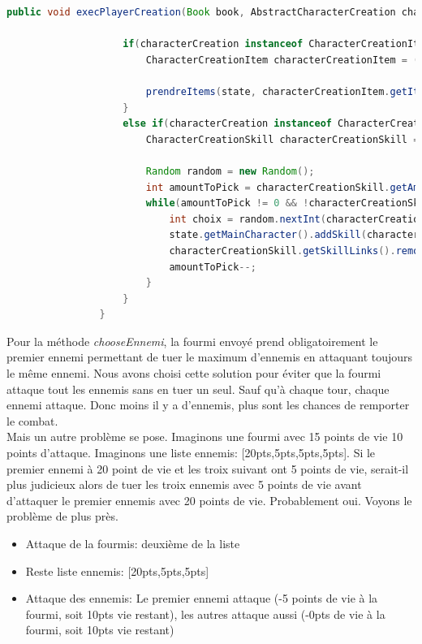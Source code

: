 			\begin{lstlisting}[gobble=16, language=java, caption=execPlayerCreation() de Fourmis]
				public void execPlayerCreation(Book book, AbstractCharacterCreation characterCreation, BookState state) {

					if(characterCreation instanceof CharacterCreationItem){
						CharacterCreationItem characterCreationItem = (CharacterCreationItem) characterCreation;

						prendreItems(state, characterCreationItem.getItemLinks(), characterCreationItem.getAmountToPick());
					}
					else if(characterCreation instanceof CharacterCreationSkill){
						CharacterCreationSkill characterCreationSkill = (CharacterCreationSkill) characterCreation;

						Random random = new Random();
						int amountToPick = characterCreationSkill.getAmountToPick();
						while(amountToPick != 0 && !characterCreationSkill.getSkillLinks().isEmpty()) {
							int choix = random.nextInt(characterCreationSkill.getSkillLinks().size());
							state.getMainCharacter().addSkill(characterCreationSkill.getSkillLinks().get(choix));
							characterCreationSkill.getSkillLinks().remove(choix);
							amountToPick--;
						}
					}
				}
			\end{lstlisting}

			Pour la méthode \textit{chooseEnnemi}, la fourmi envoyé prend obligatoirement le premier ennemi permettant de tuer le maximum d'ennemis en attaquant toujours le même ennemi. Nous avons choisi cette solution pour éviter que la fourmi attaque tout les ennemis sans en tuer un seul. Sauf qu'à chaque tour, chaque ennemi attaque. Donc moins il y a d'ennemis, plus sont les chances de remporter le combat.\\
			Mais un autre problème se pose. Imaginons une fourmi avec 15 points de vie 10 points d'attaque. Imaginons une liste ennemis: [20pts,5pts,5pts,5pts]. Si le premier ennemi à 20 point de vie et les troix suivant ont 5 points de vie, serait-il plus judicieux alors de tuer les troix ennemis avec 5 points de vie avant d'attaquer le premier ennemis avec 20 points de vie. Probablement oui. Voyons le problème de plus près.
			\begin{itemize}
				\item Attaque de la fourmis: deuxième de la liste
				\item Reste liste ennemis: [20pts,5pts,5pts]
				\item Attaque des ennemis: Le premier ennemi attaque (-5 points de vie à la fourmi, soit 10pts vie restant), les autres attaque aussi (-0pts de vie à la fourmi, soit 10pts vie restant)
			\end{itemize}

